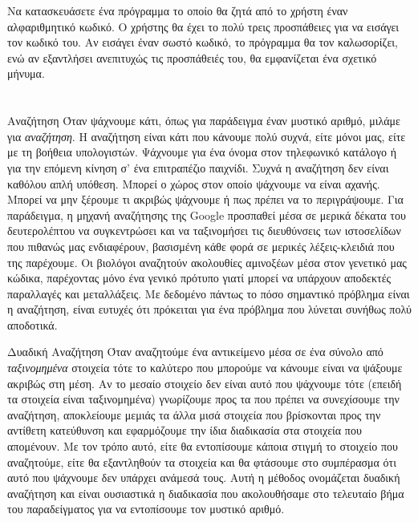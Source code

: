 \documentclass[a4paper,11pt,oneside]{book}
\begin{document}
\begin{exercise}
Να κατασκευάσετε ένα πρόγραμμα το οποίο θα ζητά από το χρήστη έναν αλφαριθμητικό κωδικό. Ο χρήστης θα έχει το πολύ τρεις προσπάθειες για να εισάγει τον κωδικό του. Αν εισάγει έναν σωστό κωδικό, το πρόγραμμα θα τον καλωσορίζει, ενώ αν εξαντλήσει ανεπιτυχώς τις προσπάθειές του, θα εμφανίζεται ένα σχετικό μήνυμα. 
\end{exercise}


\section*{}
\vspace{4\parskip}
\hrulefill


\begin{theory}{Αναζήτηση}
Όταν ψάχνουμε κάτι, όπως για παράδειγμα έναν μυστικό αριθμό, μιλάμε για \emph{αναζήτηση}. Η αναζήτηση είναι κάτι που κάνουμε πολύ συχνά, είτε μόνοι μας, είτε με τη βοήθεια υπολογιστών. Ψάχνουμε για ένα όνομα στον τηλεφωνικό κατάλογο ή για την επόμενη κίνηση σ' ένα επιτραπέζιο παιχνίδι. Συχνά η αναζήτηση δεν είναι καθόλου απλή υπόθεση. Μπορεί ο χώρος στον οποίο ψάχνουμε να είναι αχανής. Μπορεί να μην ξέρουμε τι ακριβώς ψάχνουμε ή πως πρέπει να το περιγράψουμε. Για παράδειγμα, η μηχανή αναζήτησης της Google προσπαθεί μέσα σε μερικά δέκατα του δευτερολέπτου να συγκεντρώσει και να ταξινομήσει τις διευθύνσεις των ιστοσελίδων που πιθανώς μας ενδιαφέρουν, βασισμένη κάθε φορά σε μερικές λέξεις-κλειδιά που της παρέχουμε. Οι βιολόγοι αναζητούν ακολουθίες αμινοξέων μέσα στον γενετικό μας κώδικα, παρέχοντας μόνο ένα γενικό πρότυπο γιατί μπορεί να υπάρχουν αποδεκτές παραλλαγές και μεταλλάξεις. Με δεδομένο πάντως το πόσο σημαντικό πρόβλημα είναι η αναζήτηση, είναι ευτυχές ότι πρόκειται για ένα πρόβλημα που λύνεται συνήθως πολύ αποδοτικά.
\end{theory}

\begin{theory}{Δυαδική Αναζήτηση}
Όταν αναζητούμε ένα αντικείμενο μέσα σε ένα σύνολο από \emph{ταξινομημένα} στοιχεία τότε το καλύτερο που μπορούμε να κάνουμε είναι να ψάξουμε ακριβώς στη μέση. Αν το μεσαίο στοιχείο δεν είναι αυτό που ψάχνουμε τότε (επειδή τα στοιχεία είναι ταξινομημένα) γνωρίζουμε προς τα που πρέπει να συνεχίσουμε την αναζήτηση, αποκλείουμε μεμιάς τα άλλα μισά στοιχεία που βρίσκονται προς την αντίθετη κατεύθυνση και εφαρμόζουμε την ίδια διαδικασία στα στοιχεία που απομένουν. Με τον τρόπο αυτό, είτε θα εντοπίσουμε κάποια στιγμή το στοιχείο που αναζητούμε, είτε θα εξαντληθούν τα στοιχεία και θα φτάσουμε στο συμπέρασμα ότι αυτό που ψάχνουμε δεν υπάρχει ανάμεσά τους. Αυτή η μέθοδος ονομάζεται δυαδική αναζήτηση και είναι ουσιαστικά η διαδικασία που ακολουθήσαμε στο τελευταίο βήμα του παραδείγματος για να εντοπίσουμε τον μυστικό αριθμό. 
\end{theory}
\end{document}
